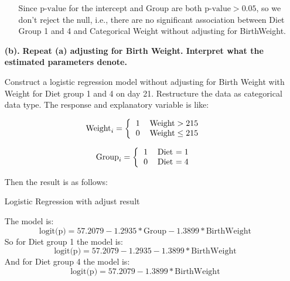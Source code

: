 \documentclass[10pt,letterpaper]{article}
\begin{document}
\begin{enumerate}[leftmargin=0cm,itemindent=.5cm,labelwidth=\itemindent,labelsep=0cm,align=left]
\begin{enumerate}[leftmargin=0cm,itemindent=.5cm,labelwidth=\itemindent,labelsep=0cm,align=left]
Since $\text{p-value}$ for the intercept and Group are both $\text{p-value}>0.05$, so we don't reject the null, i.e., there are no significant association between Diet Group 1 and 4 and Categorical Weight without adjusting for BirthWeight.
\end{enumerate}

\item[\textbf{(b).} ] \textbf{Repeat (a) adjusting for Birth Weight. Interpret what the estimated parameters denote.}

Construct a logistic regression model without adjusting for Birth Weight with Weight for Diet group 1 and 4 on day 21. Restructure the data as categorical data type. The response and explanatory variable is like:\\
\begin{multicols}{2}
\[\text{Weight}_i=  
\left \{
  \begin{tabular}{cc}
  1 &  $\text{Weight}>215$\\
  0 &  $\text{Weight} \leq 215$\\
  \end{tabular}
\right.
\]

\[\text{Group}_i=  
\left \{
  \begin{tabular}{cc}
  1 & Diet $= 1$\\
  0 & Diet $= 4$ \\
  \end{tabular}
\right.
\]
\end{multicols}
Then the result is as follows:
\begin{center}
Logistic Regression with adjust result

\end{center}
The model is:
\[ \text{logit(p)} = 57.2079-1.2935*\text{Group} -1.3899*\text{BirthWeight}\]
So for Diet group 1 the model is:
\[ \text{logit(p)} = 57.2079-1.2935-1.3899*\text{BirthWeight}\]
And for Diet group 4 the model is:
\[ \text{logit(p)} = 57.2079-1.3899*\text{BirthWeight}\]


\end{enumerate}
\end{document}
